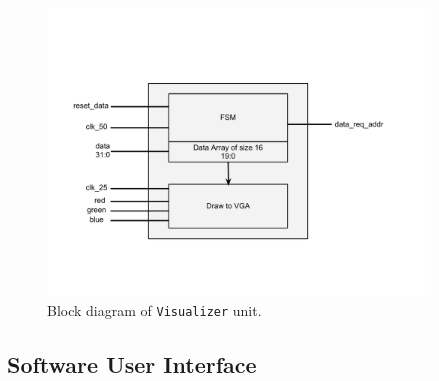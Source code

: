 \documentclass{article}
\begin{document}
\begin{figure}[H]
	\centering
	\includegraphics[width=4in]{viz_block_diagram}
	\caption{Block diagram of \texttt{Visualizer} unit.}
\end{figure}

\subsection{Software User Interface}
\end{document}
